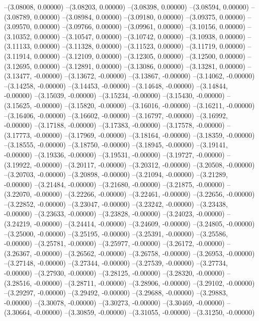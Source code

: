 --(3.08008, 0.00000)
--(3.08203, 0.00000)
--(3.08398, 0.00000)
--(3.08594, 0.00000)
--(3.08789, 0.00000)
--(3.08984, 0.00000)
--(3.09180, 0.00000)
--(3.09375, 0.00000)
--(3.09570, 0.00000)
--(3.09766, 0.00000)
--(3.09961, 0.00000)
--(3.10156, 0.00000)
--(3.10352, 0.00000)
--(3.10547, 0.00000)
--(3.10742, 0.00000)
--(3.10938, 0.00000)
--(3.11133, 0.00000)
--(3.11328, 0.00000)
--(3.11523, 0.00000)
--(3.11719, 0.00000)
--(3.11914, 0.00000)
--(3.12109, 0.00000)
--(3.12305, 0.00000)
--(3.12500, 0.00000)
--(3.12695, 0.00000)
--(3.12891, 0.00000)
--(3.13086, 0.00000)
--(3.13281, 0.00000)
--(3.13477, -0.00000)
--(3.13672, -0.00000)
--(3.13867, -0.00000)
--(3.14062, -0.00000)
--(3.14258, -0.00000)
--(3.14453, -0.00000)
--(3.14648, -0.00000)
--(3.14844, -0.00000)
--(3.15039, -0.00000)
--(3.15234, -0.00000)
--(3.15430, -0.00000)
--(3.15625, -0.00000)
--(3.15820, -0.00000)
--(3.16016, -0.00000)
--(3.16211, -0.00000)
--(3.16406, -0.00000)
--(3.16602, -0.00000)
--(3.16797, -0.00000)
--(3.16992, -0.00000)
--(3.17188, -0.00000)
--(3.17383, -0.00000)
--(3.17578, -0.00000)
--(3.17773, -0.00000)
--(3.17969, -0.00000)
--(3.18164, -0.00000)
--(3.18359, -0.00000)
--(3.18555, -0.00000)
--(3.18750, -0.00000)
--(3.18945, -0.00000)
--(3.19141, -0.00000)
--(3.19336, -0.00000)
--(3.19531, -0.00000)
--(3.19727, -0.00000)
--(3.19922, -0.00000)
--(3.20117, -0.00000)
--(3.20312, -0.00000)
--(3.20508, -0.00000)
--(3.20703, -0.00000)
--(3.20898, -0.00000)
--(3.21094, -0.00000)
--(3.21289, -0.00000)
--(3.21484, -0.00000)
--(3.21680, -0.00000)
--(3.21875, -0.00000)
--(3.22070, -0.00000)
--(3.22266, -0.00000)
--(3.22461, -0.00000)
--(3.22656, -0.00000)
--(3.22852, -0.00000)
--(3.23047, -0.00000)
--(3.23242, -0.00000)
--(3.23438, -0.00000)
--(3.23633, -0.00000)
--(3.23828, -0.00000)
--(3.24023, -0.00000)
--(3.24219, -0.00000)
--(3.24414, -0.00000)
--(3.24609, -0.00000)
--(3.24805, -0.00000)
--(3.25000, -0.00000)
--(3.25195, -0.00000)
--(3.25391, -0.00000)
--(3.25586, -0.00000)
--(3.25781, -0.00000)
--(3.25977, -0.00000)
--(3.26172, -0.00000)
--(3.26367, -0.00000)
--(3.26562, -0.00000)
--(3.26758, -0.00000)
--(3.26953, -0.00000)
--(3.27148, -0.00000)
--(3.27344, -0.00000)
--(3.27539, -0.00000)
--(3.27734, -0.00000)
--(3.27930, -0.00000)
--(3.28125, -0.00000)
--(3.28320, -0.00000)
--(3.28516, -0.00000)
--(3.28711, -0.00000)
--(3.28906, -0.00000)
--(3.29102, -0.00000)
--(3.29297, -0.00000)
--(3.29492, -0.00000)
--(3.29688, -0.00000)
--(3.29883, -0.00000)
--(3.30078, -0.00000)
--(3.30273, -0.00000)
--(3.30469, -0.00000)
--(3.30664, -0.00000)
--(3.30859, -0.00000)
--(3.31055, -0.00000)
--(3.31250, -0.00000)
